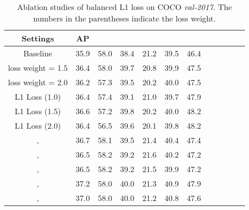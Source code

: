 \documentclass[10pt,twocolumn,letterpaper]{article}
\begin{document}
\begin{table}[htb]
	\centering
	\caption{Ablation studies of balanced L1 loss on COCO \emph{val-2017}. The numbers in the parentheses indicate the loss weight.}
	\vspace{-5pt}
	\addtolength{\tabcolsep}{-2pt}
	\begin{tabular}{*{12}{c}}
		\toprule
		Settings                        & AP   &  &  &  &  &  \\
		\midrule
		Baseline                        & 35.9 & 58.0             & 38.4             & 21.2            & 39.5            & 46.4            \\
		\midrule
		loss weight = 1.5               & 36.4 & 58.0             & 39.7             & 20.8            & 39.9            & 47.5            \\
		loss weight = 2.0               & 36.2 & 57.3             & 39.5             & 20.2            & 40.0            & 47.5            \\
		L1 Loss (1.0)                   & 36.4 & 57.4 & 39.1 & 21.0 & 39.7 &  47.9\\
		L1 Loss (1.5)                   & 36.6 & 57.2 & 39.8 & 20.2 & 40.0 & 48.2 \\
		L1 Loss (2.0)                   & 36.4 & 56.5 & 39.6 & 20.1 & 39.8 & 48.2 \\
		\midrule
		,   & 36.7 & 58.1             & 39.5             & 21.4            & 40.4            & 47.4            \\
		,   & 36.5 & 58.2             & 39.2             & 21.6            & 40.2            & 47.2            \\
		,   & 36.5 & 58.2             & 39.2             & 21.5            & 39.9            & 47.2            \\
		\midrule
		,   & 37.2 & 58.0             & 40.0             & 21.3            & 40.9            & 47.9            \\
		,   & 37.0 & 58.0             & 40.0             & 21.2            & 40.8            & 47.6            \\
		\bottomrule
	\end{tabular}
	\vspace{-10pt}
	\label{tab:loss}
\end{table}



\vspace{-12pt}
\end{document}
